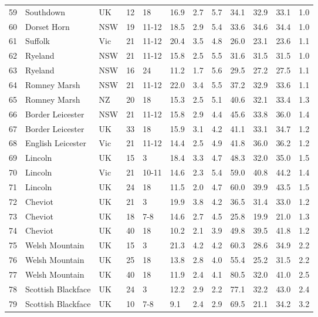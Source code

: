 \begin{center}
\begin{landscape}
\begin{longtable}{|p{0.4in}|p{0.9in}|p{0.7in}|p{0.5in}|p{0.5in}|p{0.5in}|p{0.5in}|p{0.5in}|p{0.5in}|p{0.5in}|p{0.5in}|p{0.5in}|}
 59 &  Southdown &  UK & 12 &  18 & 16.9 & 2.7 & 5.7 & 34.1 & 32.9 & 33.1 & 1.0 \\ 
 60 &  Dorset Horn &  NSW & 19 &  11-12 & 18.5 & 2.9 & 5.4 & 33.6 & 34.6 & 34.4 & 1.0 \\ 
 61 &  Suffolk &  Vic & 21 &  11-12 & 20.4 & 3.5 & 4.8 & 26.0 & 23.1 & 23.6 & 1.1 \\ 
 62 &  Ryeland &  NSW & 21 &  11-12 & 15.8 & 2.5 & 5.5 & 31.6 & 31.5 & 31.5 & 1.0 \\ 
 63 &  Ryeland &  NSW & 16 &  24 & 11.2 & 1.7 & 5.6 & 29.5 & 27.2 & 27.5 & 1.1 \\ 
 64 &  Romney Marsh &  NSW & 21 &  11-12 & 22.0 & 3.4 & 5.5 & 37.2 & 32.9 & 33.6 & 1.1 \\ 
 65 &  Romney Marsh &  NZ & 20 &  18 & 15.3 & 2.5 & 5.1 & 40.6 & 32.1 & 33.4 & 1.3 \\ 
 66 &  Border Leicester &  NSW & 21 &  11-12 & 15.8 & 2.9 & 4.4 & 45.6 & 33.8 & 36.0 & 1.4 \\ 
 67 &  Border Leicester &  UK & 33 &  18 & 15.9 & 3.1 & 4.2 & 41.1 & 33.1 & 34.7 & 1.2 \\ 
 68 &  English Leicester &  Vic & 21 &  11-12 & 14.4 & 2.5 & 4.9 & 41.8 & 36.0 & 36.2 & 1.2 \\ 
 69 &  Lincoln &  UK & 15 &  3 & 18.4 & 3.3 & 4.7 & 48.3 & 32.0 & 35.0 & 1.5 \\ 
 70 &  Lincoln &  Vic & 21 &  10-11 & 14.6 & 2.3 & 5.4 & 59.0 & 40.8 & 44.2 & 1.4 \\ 
 71 &  Lincoln &  UK & 24 &  18 & 11.5 & 2.0 & 4.7 & 60.0 & 39.9 & 43.5 & 1.5 \\ 
 72 &  Cheviot &  UK & 21 &  3 & 19.9 & 3.8 & 4.2 & 36.5 & 31.4 & 33.0 & 1.2 \\ 
 73 &  Cheviot &  UK & 18 &  7-8 & 14.6 & 2.7 & 4.5 & 25.8 & 19.9 & 21.0 & 1.3 \\ 
 74 &  Cheviot &  UK & 40 &  18 & 10.2 & 2.1 & 3.9 & 49.8 & 39.5 & 41.8 & 1.2 \\ 
 75 &  Welsh Mountain &  UK & 15 &  3 & 21.3 & 4.2 & 4.2 & 60.3 & 28.6 & 34.9 & 2.2 \\ 
 76 &  Welsh Mountain &  UK & 25 &  18 & 13.8 & 2.8 & 4.0 & 55.4 & 25.2 & 31.5 & 2.2 \\ 
 77 &  Welsh Mountain &  UK & 40 &  18 & 11.9 & 2.4 & 4.1 & 80.5 & 32.0 & 41.0 & 2.5 \\ 
 78 &  Scottish Blackface &  UK & 24 &  3 & 12.2 & 2.9 & 2.2 & 77.1 & 32.2 & 43.0 & 2.4 \\ 
 79 &  Scottish Blackface &  UK & 10 &  7-8 & 9.1 & 2.4 & 2.9 & 69.5 & 21.1 & 34.2 & 3.2 \\ 

\end{longtable}
\end{landscape}
\end{center}
